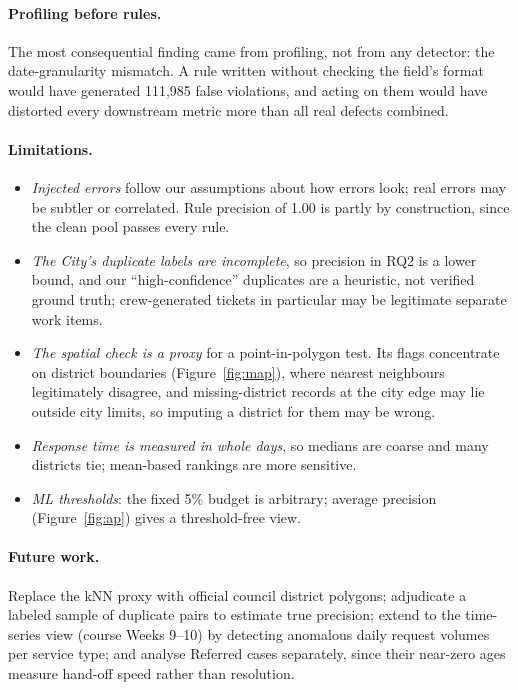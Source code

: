 \documentclass[11pt]{article}
\begin{document}
\paragraph{Profiling before rules.} The most consequential finding came from profiling, not from any detector: the date-granularity mismatch. A rule written without checking the field's format would have generated 111,985 false violations, and acting on them would have distorted every downstream metric more than all real defects combined.

\paragraph{Limitations.}
\begin{itemize}
  \item \emph{Injected errors} follow our assumptions about how errors look; real errors may be subtler or correlated. Rule precision of 1.00 is partly by construction, since the clean pool passes every rule.
  \item \emph{The City's duplicate labels are incomplete}, so precision in RQ2 is a lower bound, and our ``high-confidence'' duplicates are a heuristic, not verified ground truth; crew-generated tickets in particular may be legitimate separate work items.
  \item \emph{The spatial check is a proxy} for a point-in-polygon test. Its flags concentrate on district boundaries (Figure~\ref{fig:map}), where nearest neighbours legitimately disagree, and missing-district records at the city edge may lie outside city limits, so imputing a district for them may be wrong.
  \item \emph{Response time is measured in whole days}, so medians are coarse and many districts tie; mean-based rankings are more sensitive.
  \item \emph{ML thresholds}: the fixed 5\% budget is arbitrary; average precision (Figure~\ref{fig:ap}) gives a threshold-free view.
\end{itemize}

\paragraph{Future work.} Replace the kNN proxy with official council district polygons; adjudicate a labeled sample of duplicate pairs to estimate true precision; extend to the time-series view (course Weeks 9--10) by detecting anomalous daily request volumes per service type; and analyse Referred cases separately, since their near-zero ages measure hand-off speed rather than resolution.
\end{document}
